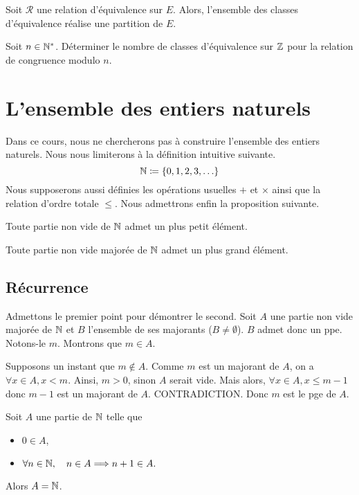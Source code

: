\documentclass{magnolia}
\begin{document}
\begin{proposition}[utile=-3]
Soit $\mathcal{R}$ une relation d'équivalence sur $E$. Alors, l'ensemble des
classes d'équivalence réalise une partition de $E$.
\end{proposition}

\begin{exoUnique}
\exo Soit $n\in{\mathbb{N}^*}$. Déterminer le nombre de classes d'équivalence sur $\mathbb{Z}$
  pour la relation de congruence modulo $n$.
\end{exoUnique}
  
  

\section{L'ensemble des entiers naturels}

Dans ce cours, nous ne chercherons pas à construire l'ensemble des entiers naturels.
Nous nous limiterons à la définition intuitive suivante.
\[\mathbb{N}\coloneqq\left\{0,1,2,3,\ldots\right\}\]
Nous supposerons aussi définies les opérations usuelles $+$ et $\times$ ainsi que la
relation d'ordre totale $\leq$. Nous admettrons enfin la proposition suivante.

\begin{proposition}[utile=-3]
Toute partie non vide de $\mathbb{N}$ admet un plus petit élément.
\end{proposition}
  
\begin{proposition}[utile=-3]
Toute partie non vide majorée de $\mathbb{N}$ admet un plus grand élément.
\end{proposition}

\subsection{Récurrence}


\begin{preuve}
Admettons le premier point pour démontrer le second. Soit $A$ une partie non vide majorée de $\mathbb{N}$ et $B$ l'ensemble de ses majorants ($B\neq \emptyset$). $B$ admet donc un ppe. Notons-le $m$. Montrons que $m\in A$.

Supposons un instant que $m\notin A$. Comme $m$ est un majorant de $A$, on a $\forall x \in A, x<m$. Ainsi, $m>0$, sinon $A$ serait vide. Mais alors, $\forall x \in A, x\leq m-1$ donc $m-1$ est un majorant de $A$. CONTRADICTION. Donc $m$ est le pge de $A$.
\end{preuve}

\begin{proposition}[utile=-3, nom={Principe de récurrence}]
Soit $A$ une partie de $\mathbb{N}$ telle que
\begin{itemize}
\item $0\in A$,
\item $\forall n\in\mathbb{N},\quad n\in A \Longrightarrow n+1 \in A.$
\end{itemize}
Alors $A=\mathbb{N}$.
\end{proposition}
\end{document}
